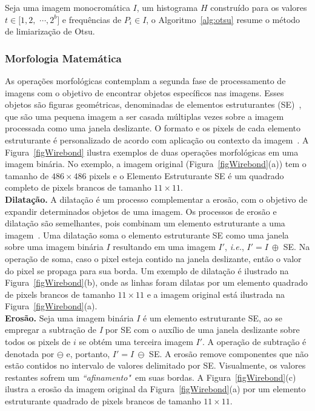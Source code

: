 Seja uma imagem monocromática $I$, um histograma $H$ construído para os valores $t \in [1, 2,$ $\cdots, 2^b]$ e frequências de $P_i \in I$, o Algoritmo~\ref{alg:otsu} resume o método de limiarização de Otsu.

\subsubsection{Morfologia Matemática}

As operações morfológicas contemplam a segunda fase de processamento de imagens com o objetivo de encontrar objetos específicos nas imagens.
Esses objetos são figuras geométricas, denominadas de elementos estruturantes (SE)~\cite{Zhang2011}, que são uma pequena imagem a ser casada múltiplas vezes sobre a imagem processada como uma janela deslizante.
O formato e os pixels de cada elemento estruturante é personalizado de acordo com aplicação ou contexto da imagem~\cite{Gonzalez2008}.
A Figura~\ref{figWirebond} ilustra exemplos de duas operações morfológicas em uma imagem binária. 
No exemplo, a imagem original (Figura~\ref{figWirebond}(a)) tem o tamanho de $486 \times 486$ pixels e o Elemento Estruturante SE é um quadrado completo de pixels brancos de tamanho $11 \times 11$.\\

\noindent
\textbf{Dilatação.}
A dilatação é um processo complementar a erosão, com o objetivo de expandir determinados objetos de uma imagem.
Os processos de erosão e dilatação são semelhantes, pois combinam um elemento estruturante a uma imagem~\cite{Sonka1993}.
Uma dilatação soma o elemento estruturante SE como uma janela sobre uma imagem binária $I$ resultando em uma imagem $I'$, \textit{i.e.}, $I' = I ~\oplus$ SE.
Na operação de soma, caso o pixel esteja contido na janela deslizante, então o valor do pixel se propaga para sua borda.
Um exemplo de dilatação é ilustrado na Figura~\ref{figWirebond}(b), onde as linhas foram dilatas por um elemento quadrado de pixels brancos de tamanho $11 \times 11$ e a imagem original está ilustrada na Figura~\ref{figWirebond}(a).\\

\noindent
\textbf{Erosão.}
Seja uma imagem binária $I$ é um elemento estruturante SE, ao se empregar a subtração de \textit{I} por SE com o auxílio de uma janela deslizante sobre todos os pixels de $i$ se obtém uma terceira imagem $I'$.
A operação de subtração é denotada por $\ominus$ e, portanto, $I' = I ~\ominus$ SE.
A erosão remove componentes que não estão contidos no intervalo de valores delimitado por SE. 
Visualmente, os valores restantes sofrem um \textit{``afinamento"}~em suas bordas.
A Figura~\ref{figWirebond}(c) ilustra a erosão da imagem original da Figura~\ref{figWirebond}(a) por um elemento estruturante quadrado de pixels brancos de tamanho $11 \times 11$.\\

